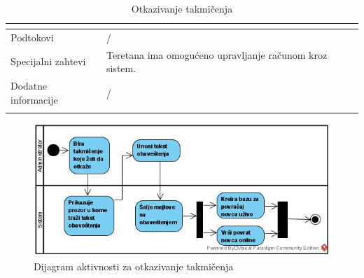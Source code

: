 \documentclass[../../main.tex]{subfiles}
\begin{document}
\begin{longtable}{| p{} | p{} |}
\begin{itemize}
    \end{itemize}\\
\hline
    Podtokovi & /\\
\hline
    Specijalni zahtevi & Teretana ima omogućeno upravljanje računom kroz sistem.\\
\hline
    Dodatne informacije & /\\
\hline
\caption{Otkazivanje takmičenja} %
\end{longtable}

\begin{figure}[!ht]
\begin{center}
\includegraphics[scale=0.55]{sections/images/dijagram_aktivnosti_otkazivanje_takmicenja.jpg}
\end{center}
\caption{Dijagram aktivnosti za otkazivanje takmičenja}
\label{fig:kontekst}
\end{figure}
\end{document}
